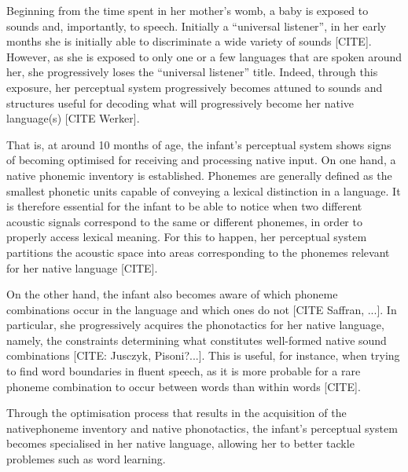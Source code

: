 




Beginning from the time spent in her mother's womb, a baby is exposed to sounds and, importantly, to speech. Initially a ``universal listener'', in her early months she is initially able to discriminate a wide variety of sounds [CITE]. However, as she is exposed to only one or a few languages that are spoken around her, she progressively loses the ``universal listener'' title. Indeed, through this exposure, her perceptual system progressively becomes attuned to sounds and structures useful for decoding what will progressively become her native language(s) [CITE Werker].

That is, at around 10 months of age, the infant's perceptual system shows signs of becoming optimised for receiving and processing native input.
On one hand, a native phonemic inventory is established. Phonemes are generally defined as the smallest phonetic units capable of conveying a lexical distinction in a language. It is therefore essential for the infant to be able to notice when two different acoustic signals correspond to the same or different phonemes, in order to properly access lexical meaning. For this to happen, her perceptual system partitions the acoustic space into areas corresponding to the phonemes relevant for her native language [CITE]. 

On the other hand, the infant also becomes aware of which phoneme combinations occur in the language and which ones do not [CITE Saffran, ...]. In particular, she progressively acquires the phonotactics for her native language, namely, the constraints determining what constitutes well-formed native sound combinations [CITE: Jusczyk, Pisoni?...]. This is useful, for instance, when trying to find word boundaries in fluent speech, as it is more probable for a rare phoneme combination to occur between words than within words [CITE]. 

Through the optimisation process that results in the acquisition of the nativephoneme inventory and native phonotactics, the infant's perceptual system becomes specialised in her native language, allowing her to better tackle problemes such as word learning.  

